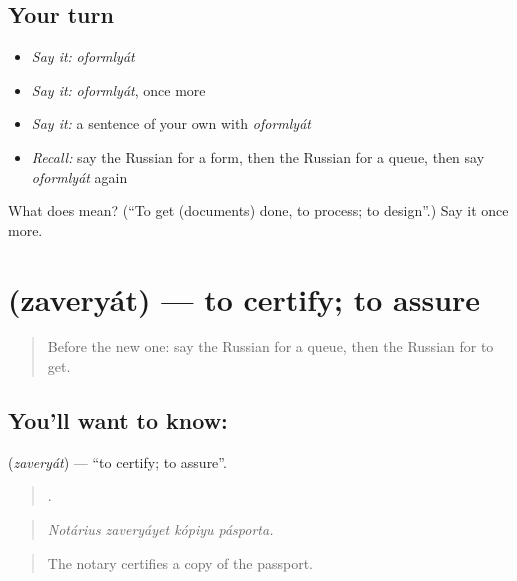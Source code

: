 \subsection*{Your turn}
\begin{itemize}
\raggedright
  \item \emph{Say it:} \emph{oformlyát}
  \item \emph{Say it:} \emph{oformlyát}, once more
  \item \emph{Say it:} a sentence of your own with \emph{oformlyát}
  \item \emph{Recall:} say the Russian for a form, then the Russian for a queue, then say \emph{oformlyát} again
\end{itemize}

\begin{tcolorbox}[breakable,colback=teal!4,colframe=teal!35!black,title={Before you move on}]
What does  mean? (\textquotedblleft{}To get (documents) done, to process; to design\textquotedblright{}.) Say it once more.
\end{tcolorbox}
\section[\texorpdfstring{\ru{заверять} (zaveryát)}{заверять (zaveryát)}]{ (zaveryát) — to certify; to assure}

\label{lesson:RU-C450-zaveryat}



\begin{quote}
Before the new one: say the Russian for a queue, then the Russian for to get.
\end{quote}

\subsection*{You'll want to know: }
\textbf{} (\emph{zaveryát}) — \textquotedblleft{}to certify; to assure\textquotedblright{}.

\begin{quote}
   .
\end{quote}

\begin{quote}
\emph{Notárius zaveryáyet kópiyu pásporta.}
\end{quote}

\begin{quote}
The notary certifies a copy of the passport.
\end{quote}

